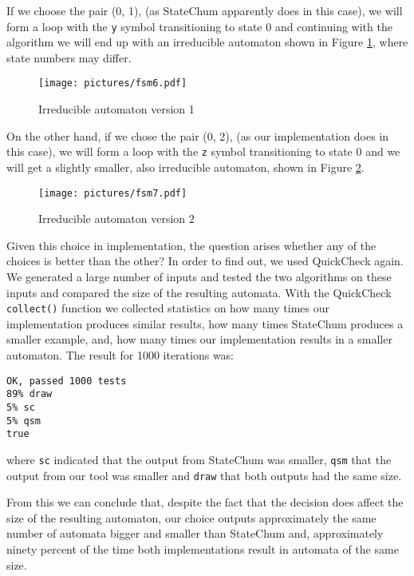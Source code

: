 \documentclass[]{sigplanconf}
\begin{document}
If we choose the pair (0, 1), (as StateChum apparently does in this case), we will
form a loop with the \texttt{y} symbol transitioning to state 0 and continuing with
the algorithm we will end up with an irreducible automaton shown in Figure \ref{fsm6}, where state 
numbers may differ.

\begin{figure}
\begin{center}
\texttt{[image: pictures/fsm6.pdf]}
\end{center}
\caption{Irreducible automaton version 1}
\label{fsm6}
\end{figure}
 
On the other hand, if we chose the pair (0, 2), (as our implementation does in this
case), we will form a loop with the \texttt{z} symbol transitioning to state 0 and
we will get a slightly smaller, also irreducible automaton, shown in Figure \ref{fsm7}.

\begin{figure}
\begin{center}
\texttt{[image: pictures/fsm7.pdf]}
\end{center}
\caption{Irreducible automaton version 2}
\label{fsm7}
\end{figure}

Given this choice in implementation, the question arises whether any of the
choices is better than the other? In order to find out, we used QuickCheck again. 
We generated a large number of inputs
and tested the two algorithms on these inputs and compared the size of
the resulting automata. With the QuickCheck \texttt{collect()} function we
collected statistics on how
many times our implementation produces similar results, how many times StateChum
produces a smaller example, and, how many
times our implementation results in a smaller automaton. The result for 1000
iterations was:

\begin{verbatim}
OK, passed 1000 tests
89% draw
5% sc
5% qsm
true
\end{verbatim}
where \texttt{sc} indicated that the output from StateChum was smaller, \texttt{qsm}
that the output from our tool was smaller and \texttt{draw} that both
outputs had the same size.

From this we can conclude that, despite the fact that the decision does affect the size of
the resulting automaton, our choice
outputs approximately the same number of automata bigger and smaller than
StateChum and, approximately ninety percent of the time both implementations result
in automata of the same size.
\end{document}
